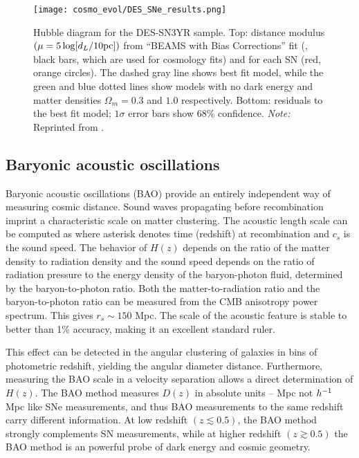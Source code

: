 \begin{figure}[hbt]
    \centering
    \texttt{[image: cosmo\_evol/DES\_SNe\_results.png]}
    \caption{Hubble diagram for the DES-SN3YR sample. Top: distance modulus $(\mu =5\log [d_L/10\rm{pc}])$ from ``BEAMS with Bias Corrections'' fit (\cite{Kessler_2017}, black bars, which are used for cosmology fits) and for each SN (red, orange circles). The dashed gray line shows best fit model, while the green and blue dotted lines show models with no dark energy and matter densities $\Omega_m = 0.3$ and $1.0$ respectively. Bottom: residuals to the best fit model; $1\sigma$ error bars show 68\% confidence. \textit{Note:} Reprinted from \parencite{Abbott_2019}.}
    \label{fig:des_sne_results}
\end{figure}
\subsection{Baryonic acoustic oscillations}
Baryonic acoustic oscillations (BAO) provide an entirely independent way of measuring cosmic distance. Sound waves propagating before recombination imprint a characteristic scale on matter clustering. The acoustic length scale can be computed as
where asterisk denotes time (redshift) at recombination and $c_s$ is the sound speed. The behavior of $H(z)$ depends on the ratio of the matter density to radiation density and the sound speed depends on the ratio of radiation pressure to the energy density of the baryon-photon fluid, determined by the baryon-to-photon ratio. Both the matter-to-radiation ratio and the baryon-to-photon ratio can be measured from the CMB anisotropy power spectrum. This gives $r_s\sim150$ Mpc. The scale of the acoustic feature is stable to better than 1\% accuracy, making it an excellent standard ruler.

This effect can be detected in the angular clustering of galaxies in bins of photometric redshift, yielding the angular diameter distance. Furthermore, measuring the BAO scale in a velocity separation allows a direct determination of $H(z)$. The BAO method measures $D(z)$ in absolute units -- Mpc not $h^{-1}$ Mpc like SNe measurements, and thus BAO measurements to the same redshift carry different information. At low redshift $(z\lesssim0.5)$, the BAO method strongly complements SN measurements, while at higher redshift $(z\gtrsim0.5)$ the BAO method is an powerful probe of dark energy and cosmic geometry.

